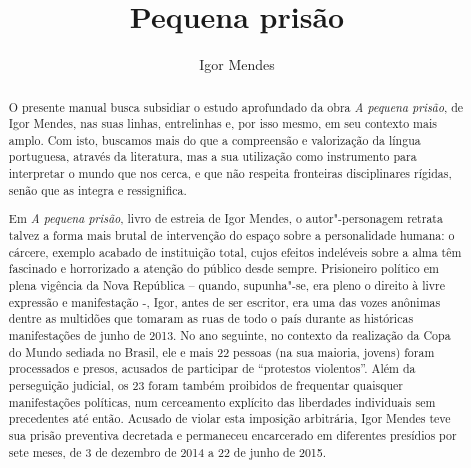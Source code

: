 \documentclass[11pt]{extarticle}
\begin{document}
\newcommand{\AutorLivro}{Igor Mendes}
\newcommand{\TituloLivro}{Pequena prisão}
\newcommand{\Tema}{Protagonismo juvenil}
\newcommand{\Genero}{Diário; biografia; autobiografia; relatos; memórias}
\newcommand{\imagemCapa}{./images/PNLD0062-MP-C.png}
\newcommand{\issnppub}{978-65-86941-37-1}
\newcommand{\issnepub}{978-65-86941-33-3}
\newcommand{\colaborador}{{Rebeca Martins de Souza}}


\title{\TituloLivro}
\author{\AutorLivro}
\def\authornotes{\colaborador}

\date{}
\maketitle


\begin{abstract}

O presente manual busca subsidiar o estudo aprofundado da obra \emph{A
pequena prisão}, de Igor Mendes, nas suas linhas, entrelinhas e, por
isso mesmo, em seu contexto mais amplo. Com isto, buscamos mais do que a
compreensão e valorização da língua portuguesa, através da literatura,
mas a sua utilização como instrumento para interpretar o mundo que nos
cerca, e que não respeita fronteiras disciplinares rígidas, senão que as
integra e ressignifica.

Em \emph{A pequena prisão}, livro de estreia de Igor Mendes, o
autor"-personagem retrata talvez a forma mais brutal de intervenção do
espaço sobre a personalidade humana: o cárcere, exemplo acabado de
instituição total, cujos efeitos indeléveis sobre a alma têm fascinado e
horrorizado a atenção do público desde sempre. Prisioneiro político em
plena vigência da Nova República -- quando, supunha"-se, era pleno o
direito à livre expressão e manifestação -, Igor, antes de ser escritor,
era uma das vozes anônimas dentre as multidões que tomaram as ruas de
todo o país durante as históricas manifestações de junho de 2013. No ano
seguinte, no contexto da realização da Copa do Mundo sediada no Brasil,
ele e mais 22 pessoas (na sua maioria, jovens) foram processados e
presos, acusados de participar de ``protestos violentos''. Além da
perseguição judicial, os 23 foram também proibidos de frequentar
quaisquer manifestações políticas, num cerceamento explícito das
liberdades individuais sem precedentes até então. Acusado de violar esta
imposição arbitrária, Igor Mendes teve sua prisão preventiva decretada e
permaneceu encarcerado em diferentes presídios por sete meses, de 3 de
dezembro de 2014 a 22 de junho de 2015.


\end{abstract}
\end{document}
